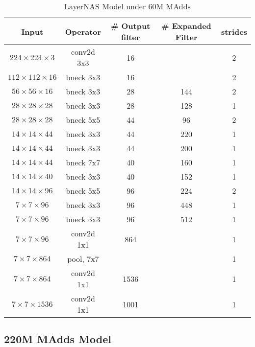 \begin{table}
\caption{LayerNAS Model under 60M MAdds} 
\begin{center}

\begin{tabular}[hp]{c|c|c|c|c}
\hline
\hline
 Input &Operator  &\# Output filter &\# Expanded Filter &strides\\ 
\hline
 $224\times224\times3$ &conv2d 3x3 &16 & &2 \\
\hline
 $112\times112\times16$ &bneck 3x3 &16 & &2 \\
\hline
 $56\times56\times16$ &bneck 3x3 &28 &144 &2 \\
 $28\times28\times28$ &bneck 3x3 &28 &128 &1 \\
\hline
 $28\times28\times28$ &bneck 5x5 &44 &96 &2 \\
 $14\times14\times44$ &bneck 3x3 &44 &220 &1 \\
 $14\times14\times44$ &bneck 3x3 &44 &200 &1 \\
\hline
 $14\times14\times44$ &bneck 7x7 &40 &160 &1 \\
 $14\times14\times40$ &bneck 3x3 &40 &152 &1 \\
\hline
 $14\times14\times96$ &bneck 5x5 &96 &224 &2 \\
 $7\times7\times96$ &bneck 3x3 &96 &448 &1 \\
 $7\times7\times96$ &bneck 3x3 &96 &512 &1 \\
\hline
 $7\times7\times96$ &conv2d 1x1 &864 & &1 \\
 $7\times7\times864$ &pool, 7x7  & & &1\\
 $7\times7\times864$ &conv2d 1x1  &1536 & &1 \\
 $7\times7\times1536$ &conv2d 1x1 &1001 & &1 \\
\hline
\hline

\end{tabular}
\end{center}
\end{table}




\subsection{220M MAdds Model}



